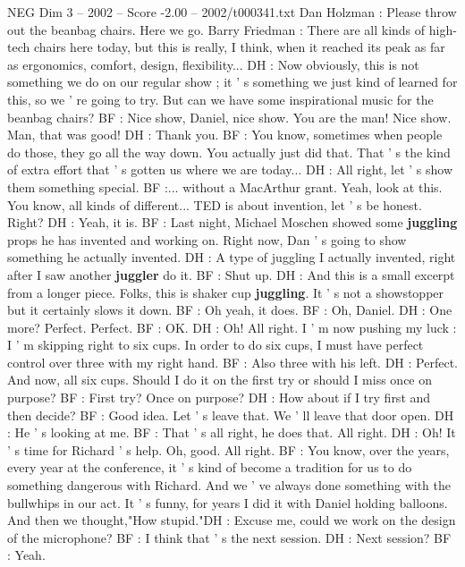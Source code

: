 \begin{textsample}{NEG Dim 3 – 2002 – Score -2.00 – 2002/t000341.txt}  \label{ex:f3_neg_008}
Dan Holzman : Please throw out the beanbag chairs.
Here we go.
Barry Friedman : There are all kinds of high-tech chairs here today, but this is really, I think, when it reached its peak as far as ergonomics, comfort, design, flexibility...
DH : Now obviously, this is not something we do on our regular show ; it ' s something we just kind of learned for this, so we ' re going to try.
But can we have some inspirational music for the beanbag chairs?
BF : Nice show, Daniel, nice show.
You are the man!
Nice show.
Man, that was good!
DH : Thank you.
BF : You know, sometimes when people do those, they go all the way down.
You actually just did that.
That ' s the kind of extra effort that ' s gotten us where we are today...
DH : All right, let ' s show them something special.
BF :... without a MacArthur grant.
Yeah, look at this.
You know, all kinds of different...
TED is about invention, let ' s be honest.
Right?
DH : Yeah, it is.
BF : Last night, Michael Moschen showed some \textbf{juggling} props he has invented and working on.
Right now, Dan ' s going to show something he actually invented.
DH : A type of juggling I actually invented, right after I saw another \textbf{juggler} do it.
BF : Shut up.
DH : And this is a small excerpt from a longer piece.
Folks, this is shaker cup \textbf{juggling}.
It ' s not a showstopper but it certainly slows it down.
BF : Oh yeah, it does.
BF : Oh, Daniel.
DH : One more?
Perfect.
Perfect.
BF : OK.
DH : Oh!
All right.
I ' m now pushing my luck : I ' m skipping right to six cups.
In order to do six cups, I must have perfect control over three with my right hand.
BF : Also three with his left.
DH : Perfect.
And now, all six cups.
Should I do it on the first try or should I miss once on purpose?
BF : First try?
Once on purpose?
DH : How about if I try first and then decide?
BF : Good idea.
Let ' s leave that.
We ' ll leave that door open.
DH : He ' s looking at me.
BF : That ' s all right, he does that.
All right.
DH : Oh!
It ' s time for Richard ' s help.
Oh, good.
All right.
BF : You know, over the years, every year at the conference, it ' s kind of become a tradition for us to do something dangerous with Richard.
And we ' ve always done something with the bullwhips in our act.
It ' s funny, for years I did it with Daniel holding balloons.
And then we thought,"How stupid."DH : Excuse me, could we work on the design of the microphone?
BF : I think that ' s the next session.
DH : Next session?
BF : Yeah.

\end{textsample}
